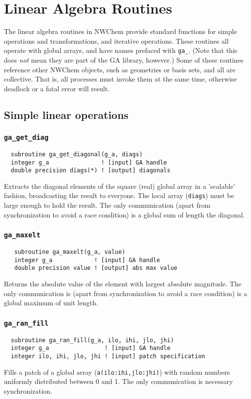 \section{Linear Algebra Routines}
\label{sec:la}

The linear algebra routines in NWChem provide standard functions for
simple operations and transformations, and iterative operations.
These routines all operate with global arrays, and have names
prefaced with \verb+ga_+.  (Note that this does {\em not} mean they
are part of the GA library, however.)  Some of these routines
reference other NWChem objects, such as geometries or basis sets,
and all are collective.  That is, all processes must invoke them
at the same time, otherwise deadlock or a fatal error will result.

\subsection{Simple linear operations}

\subsubsection{{\tt ga\_get\_diag}}
\begin{verbatim}
  subroutine ga_get_diagonal(g_a, diags)
  integer g_a               ! [input] GA handle
  double precision diags(*) ! [output] diagonals
\end{verbatim}
Extracts the diagonal elements of the square (real) global array in a
'scalable' fashion, broadcasting the result to everyone.  The local
array (\verb+diags+) must be large enough to hold the result.  The
only communication (apart from synchronization to avoid a race
condition) is a global sum of length the diagonal.

\subsubsection{{\tt ga\_maxelt}}
\begin{verbatim}
   subroutine ga_maxelt(g_a, value)
   integer g_a            ! [input] GA handle
   double precision value ! [output] abs max value
\end{verbatim}
Returns the absolute value of the element with largest absolute
magnitude.  The only communication is (apart from synchronization to
avoid a race condition) is a global maximum of unit length.

\subsubsection{{\tt ga\_ran\_fill}}
\begin{verbatim}
  subroutine ga_ran_fill(g_a, ilo, ihi, jlo, jhi)
  integer g_a                ! [input] GA handle
  integer ilo, ihi, jlo, jhi ! [input] patch specification
\end{verbatim}
Fills a patch of a global array (\verb+a(ilo:ihi,jlo:jhi)+) with
random numbers uniformly distributed between 0 and 1.  The only
communication is necessary synchronization.

